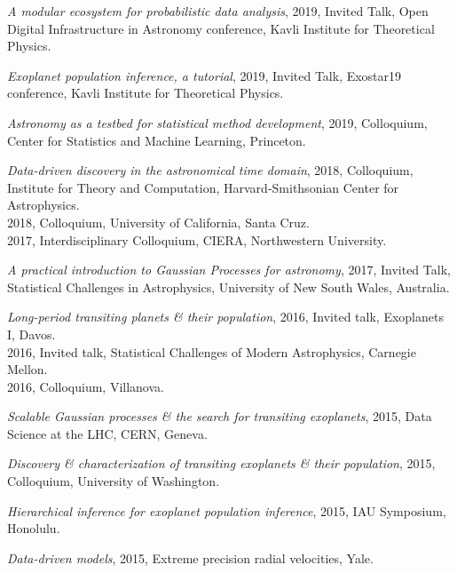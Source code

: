 \documentclass[12pt,letterpaper]{article}
\begin{document}
\begin{list}{}{\cvlist}
  \item \emph{A modular ecosystem for probabilistic data analysis},
        2019, Invited Talk, Open Digital Infrastructure in Astronomy conference,
        Kavli Institute for Theoretical Physics.

  \item \emph{Exoplanet population inference, a tutorial},
        2019, Invited Talk, Exostar19 conference,
        Kavli Institute for Theoretical Physics.

  \item \emph{Astronomy as a testbed for statistical method development},
        2019, Colloquium, Center for Statistics and Machine Learning,
        Princeton.

  \item \emph{Data-driven discovery in the astronomical time domain},
        2018, Colloquium, Institute for Theory and Computation,
        Harvard-Smithsonian Center for Astrophysics.\\
        2018, Colloquium, University of California, Santa Cruz.\\
        2017, Interdisciplinary Colloquium, CIERA, Northwestern University.

  \item \emph{A practical introduction to Gaussian Processes for astronomy},
        2017, Invited Talk, Statistical Challenges in Astrophysics,
        University of New South Wales, Australia.

  \item \emph{Long-period transiting planets \& their population},
        2016, Invited talk, Exoplanets I, Davos. \\
        2016, Invited talk, Statistical Challenges of Modern Astrophysics,
        Carnegie Mellon.\\
        2016, Colloquium, Villanova.

  \item \emph{Scalable Gaussian processes \& the search for transiting
          exoplanets}, 2015, Data Science at the LHC, CERN, Geneva.

  \item \emph{Discovery \& characterization of transiting exoplanets \& their
          population}, 2015, Colloquium, University of Washington.

  \item \emph{Hierarchical inference for exoplanet population inference},
        2015, IAU Symposium, Honolulu.

  \item \emph{Data-driven models}, 2015, Extreme precision radial velocities,
        Yale.


\end{list}
\end{document}

